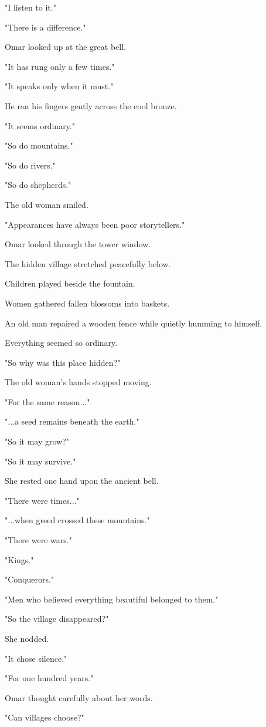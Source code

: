 \documentclass[12pt,openany]{book}
\begin{document}
"I listen to it."

"There is a difference."

Omar looked up at the great bell.

"It has rung only a few times."

"It speaks only when it must."

He ran his fingers gently across the cool bronze.

"It seems ordinary."

"So do mountains."

"So do rivers."

"So do shepherds."

The old woman smiled.

"Appearances have always been poor storytellers."

Omar looked through the tower window.

The hidden village stretched peacefully below.

Children played beside the fountain.

Women gathered fallen blossoms into baskets.

An old man repaired a wooden fence while quietly humming to himself.

Everything seemed so ordinary.

"So why was this place hidden?"

The old woman's hands stopped moving.

"For the same reason..."

"...a seed remains beneath the earth."

"So it may grow?"

"So it may survive."

She rested one hand upon the ancient bell.

"There were times..."

"...when greed crossed these mountains."

"There were wars."

"Kings."

"Conquerors."

"Men who believed everything beautiful belonged to them."

"So the village disappeared?"

She nodded.

"It chose silence."

"For one hundred years."

Omar thought carefully about her words.

"Can villages choose?"
\end{document}
